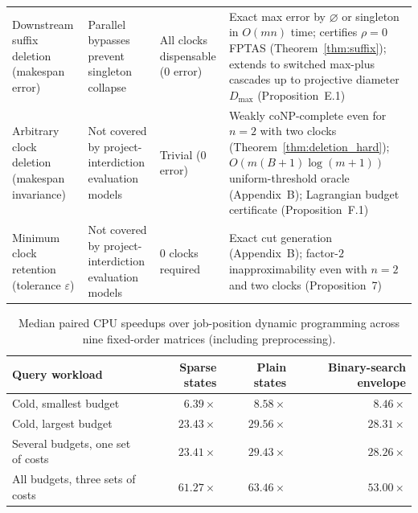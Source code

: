\documentclass[11pt,letterpaper]{article}
\begin{document}
\begin{table}[!ht]
\begin{tabularx}{\textwidth}{>{\raggedright\arraybackslash}p{2.6cm}>{\raggedright\arraybackslash}X>{\raggedright\arraybackslash}X>{\raggedright\arraybackslash}X}
Downstream suffix deletion (makespan error) & Parallel bypasses prevent singleton collapse & All clocks dispensable ($0$ error) & Exact max error by $\varnothing$ or singleton in $O(mn)$ time; certifies $\rho=0$ FPTAS (Theorem~\ref{thm:suffix}); extends to switched max-plus cascades up to projective diameter $D_{\max}$ (Proposition~E.1) \\
\addlinespace[4pt]
Arbitrary clock deletion (makespan invariance) & Not covered by project-interdiction evaluation models & Trivial ($0$ error) & Weakly coNP-complete even for $n=2$ with two clocks (Theorem~\ref{thm:deletion_hard}); $O(m(B+1)\log(m+1))$ uniform-threshold oracle (Appendix~B); Lagrangian budget certificate (Proposition~F.1) \\
\addlinespace[4pt]
Minimum clock retention (tolerance $\varepsilon$) & Not covered by project-interdiction evaluation models & $0$ clocks required & Exact cut generation (Appendix~B); factor-$2$ inapproximability even with $n=2$ and two clocks (Proposition~7) \\
\bottomrule
\end{tabularx}
\end{table}

\begin{table}[!ht]
\centering
\small
\caption{Median paired CPU speedups over job-position dynamic programming across nine fixed-order matrices (including preprocessing).}
\label{tab:speedups}
\begin{tabular}{lrrr}
\toprule
Query workload & Sparse states & Plain states & Binary-search envelope \\
\midrule
Cold, smallest budget & $6.39\times$ & $8.58\times$ & $8.46\times$ \\
Cold, largest budget & $23.43\times$ & $29.56\times$ & $28.31\times$ \\
Several budgets, one set of costs & $23.41\times$ & $29.43\times$ & $28.26\times$ \\
All budgets, three sets of costs & $61.27\times$ & $63.46\times$ & $53.00\times$ \\
\bottomrule
\end{tabular}
\end{table}
\end{document}
